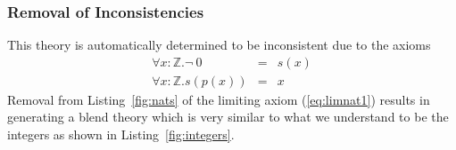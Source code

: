 \subsubsection{Removal of Inconsistencies}
This theory is automatically determined to be inconsistent due to the axioms
\begin{eqnarray}
\forall x : \mathbb{Z} . \neg \: 0 &=& s(x) \label{eq:limnat1}\\
\forall x : \mathbb{Z} . s(p(x)) &=& x \label{eq:sucpre}
\end{eqnarray}
Removal from Listing~\ref{fig:nats}
of the limiting axiom (\ref{eq:limnat1}) results in 
generating a blend theory 
which is very
similar to what we understand to be the integers as shown in Listing~\ref{fig:integers}.
